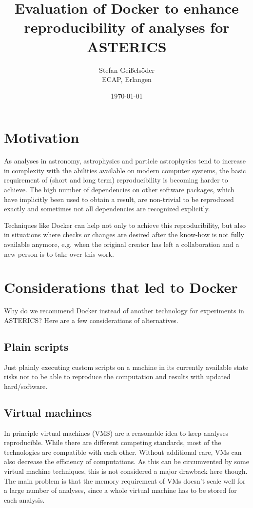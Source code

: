 \documentclass[a4paper, twoside, 11pt]{article}
\begin{document}
\title{Evaluation of Docker to enhance reproducibility of analyses for ASTERICS}
\author{Stefan Geißelsöder\\
ECAP, Erlangen}
\date{\today}
\maketitle

\section{Motivation}

As analyses in astronomy, astrophysics and particle astrophysics tend to increase in complexity 
with the abilities available on modern computer systems, 
the basic requirement of (short and long term) reproducibility is becoming harder to achieve. 
The high number of dependencies on other software packages, which have implicitly been used to obtain a result, 
are non-trivial to be reproduced exactly and sometimes not all dependencies are recognized explicitly. 

Techniques like Docker can help not only to achieve this reproducibility, 
but also in situations where checks or changes are desired after the know-how is not fully available anymore, 
e.g. when the original creator has left a collaboration and a new person is to take over this work. 

\section{Considerations that led to Docker}

Why do we recommend Docker instead of another technology for experiments in ASTERICS? 
Here are a few considerations of alternatives. 

\subsection{Plain scripts}

Just plainly executing custom scripts on a machine in its currently available state 
risks not to be able to reproduce the computation and results with updated hard/software. 

\subsection{Virtual machines}

In principle virtual machines (VMS) are a reasonable idea to keep analyses reproducible. 
While there are different competing standards, most of the technologies are compatible with each other. 
Without additional care, VMs can also decrease the efficiency of computations. 
As this can be circumvented by some virtual machine techniques, this is not considered a major drawback here though. 
The main problem is that the memory requirement of VMs doesn't scale well for a large number of analyses, 
since a whole virtual machine has to be stored for each analysis. 
\end{document}

